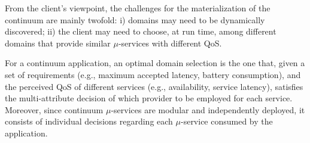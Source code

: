 %





From the client's viewpoint, the challenges for the materialization of the continuum are mainly twofold: i) domains may need to be dynamically discovered; ii) the client may need to choose, at run time, among different domains that provide similar $\mu$-services with different QoS. 

For a continuum application, an optimal domain selection is the one that, given a set of requirements (e.g., maximum accepted latency, battery consumption), and the perceived QoS of different services (e.g., availability, service latency), satisfies the multi-attribute decision of which provider to be employed for each service. Moreover, since continuum $\mu$-services are modular and independently deployed, it consists of individual decisions regarding each $\mu$-service consumed by the application.

